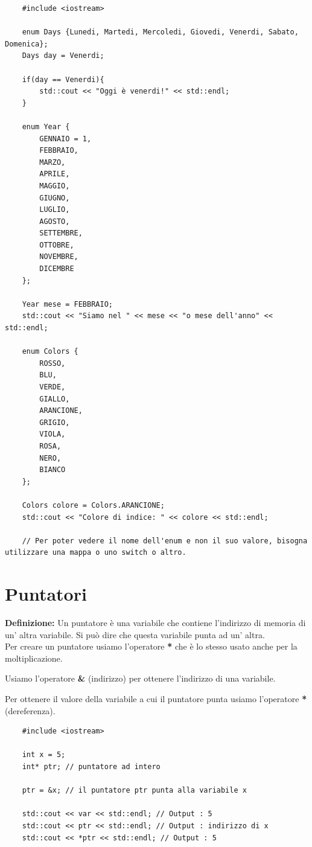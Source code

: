\begin{lstlisting}
	#include <iostream>
	
	enum Days {Lunedi, Martedi, Mercoledi, Giovedi, Venerdi, Sabato, Domenica};
	Days day = Venerdi;
	
	if(day == Venerdi){
		std::cout << "Oggi è venerdi!" << std::endl;
	}
	
	enum Year {
		GENNAIO = 1,
		FEBBRAIO,
		MARZO,
		APRILE,
		MAGGIO,
		GIUGNO,
		LUGLIO,
		AGOSTO,
		SETTEMBRE,
		OTTOBRE,
		NOVEMBRE,
		DICEMBRE
	};

	Year mese = FEBBRAIO;
	std::cout << "Siamo nel " << mese << "o mese dell'anno" << std::endl;

	enum Colors {
		ROSSO,
		BLU,
		VERDE,
		GIALLO,
		ARANCIONE,
		GRIGIO,
		VIOLA,
		ROSA,
		NERO,
		BIANCO
	};	

	Colors colore = Colors.ARANCIONE;
	std::cout << "Colore di indice: " << colore << std::endl;
	
	// Per poter vedere il nome dell'enum e non il suo valore, bisogna utilizzare una mappa o uno switch o altro.
\end{lstlisting}


\newpage

\section{Puntatori}

\textsf{\small \textbf{Definizione: } Un puntatore è una variabile che contiene l'indirizzo di memoria di un' altra variabile. Si può dire che questa variabile punta ad un' altra.} \\

\textsf{\small Per creare un puntatore usiamo l'operatore \textbf{*} che è lo stesso usato anche per la moltiplicazione.}

\textsf{\small Usiamo l'operatore \textbf{\&} (indirizzo) per ottenere l'indirizzo di una variabile.} 

\textsf{\small Per ottenere il valore della variabile a cui il puntatore punta usiamo l'operatore \textbf{*} (dereferenza).}\\

\begin{lstlisting}
	#include <iostream>
	
	int x = 5;
	int* ptr; // puntatore ad intero
	
	ptr = &x; // il puntatore ptr punta alla variabile x
	
	std::cout << var << std::endl; // Output : 5
	std::cout << ptr << std::endl; // Output : indirizzo di x
	std::cout << *ptr << std::endl; // Output : 5
\end{lstlisting}

